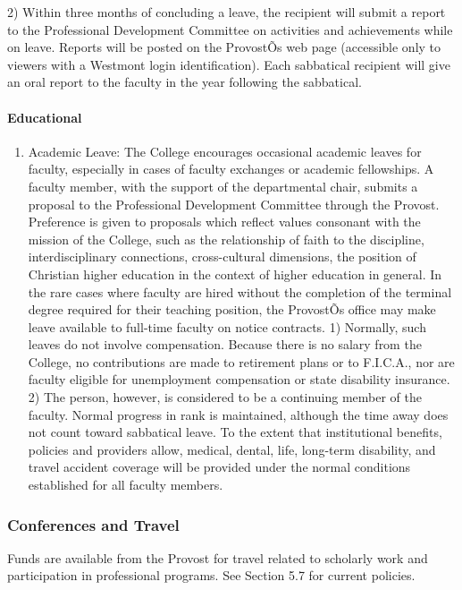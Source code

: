 \documentclass[letterpaper, 11pt]{article}
\begin{document}
\begin{enumerate}[label=\alph*)]
					2) Within three months of concluding a leave, the recipient will submit a report to the Professional Development Committee on activities and achievements while on leave.  Reports will be posted on the ProvostÕs web page (accessible only to viewers with a Westmont login identification).  Each sabbatical recipient will give an oral report to the faculty in the year following the sabbatical.
				\end{enumerate}
			\paragraph{Educational}
				\begin{enumerate}[label=\alph*)]
					\item{Academic Leave:  The College encourages occasional academic leaves for faculty, especially in cases of faculty exchanges or academic fellowships.  A faculty member, with the support of the departmental chair, submits a proposal to the Professional Development Committee through the Provost.  Preference is given to proposals which reflect values consonant with the mission of the College, such as the relationship of faith to the discipline, interdisciplinary connections, cross-cultural dimensions, the position of Christian higher education in the context of higher education in general.  In the rare cases where faculty are hired without the completion of the terminal degree required for their teaching position, the ProvostÕs office may make leave available to full-time faculty on notice contracts.}
					1) Normally, such leaves do not involve compensation.  Because there is no salary from the College, no contributions are made to retirement plans or to F.I.C.A., nor are faculty eligible for unemployment compensation or state disability insurance.
					2) The person, however, is considered to be a continuing member of the faculty. Normal progress in rank is maintained, although the time away does not count toward sabbatical leave.  To the extent that institutional benefits, policies and providers allow, medical, dental, life, long-term disability, and travel accident coverage will be provided under the normal conditions established for all faculty members.
				\end{enumerate}
		\subsubsection{Conferences and Travel}
			Funds are available from the Provost for travel related to scholarly work and participation in professional programs.  See Section 5.7 for current policies.
\end{document}
